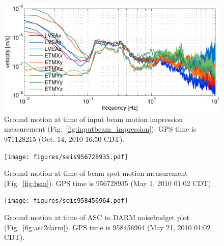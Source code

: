 \begin{figure}
\begin{centering}
\includegraphics[width=1.0\textwidth]{figures/seis971128215_highWFSgain.pdf}
\caption[]{Ground motion at time of input beam motion impression
  measurement (Fig.~\ref{fig:inputbeam_impression}). GPS time is
  971128215 (Oct. 14, 2010 16:50 CDT).}
\label{fig:seismic_highgain}
\end{centering}
\end{figure}

\begin{figure}
\begin{centering}
\texttt{[image: figures/seis956728935.pdf]}
\caption[]{Ground motion at time of beam spot motion measurement
  (Fig.~\ref{fig:bsm}). GPS time is 956728935 (May 1, 2010 01:02
  CDT).}
\label{fig:seismic_bsm}
\end{centering}
\end{figure}


\begin{figure}
\begin{centering}
\texttt{[image: figures/seis958456964.pdf]}
\caption[]{Ground motion at time of ASC to DARM noisebudget plot
  (Fig.~\ref{fig:asc2darm}). GPS time is 958456964 (May 21, 2010 01:02
  CDT).}
\label{fig:seismic_NB}
\end{centering}
\end{figure}




